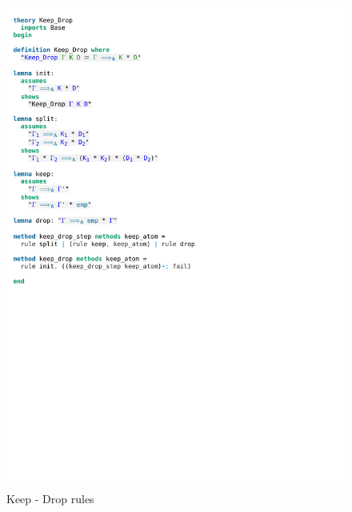 \begin{figure}[htpb]
    \includegraphics[trim={0 16,2cm 0 6,8cm}, clip, width=1.00\textwidth]{figures/Theory_Keep_Drop.pdf}
    \caption[Keep-Drop rules]{Keep - Drop rules}
    \label{fig:keep_drop_rules}
\end{figure}

